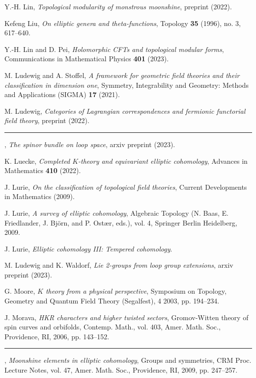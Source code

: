 \begin{description}[leftmargin=5.6em,labelwidth=5.2em,labelsep=0.4em,itemsep=0.5ex,parsep=0pt,topsep=0.8ex]
\item[\textbf{[Lin22]}] Y.-H. Lin, \textit{Topological modularity of monstrous moonshine}, preprint (2022).
\item[\textbf{[Liu96]}] Kefeng Liu, \textit{On elliptic genera and theta-functions}, Topology \textbf{35} (1996), no. 3, 617--640.
\item[\textbf{[LP23]}] Y.-H. Lin and D. Pei, \textit{Holomorphic CFTs and topological modular forms}, Communications in Mathematical Physics \textbf{401} (2023).
\item[\textbf{[LS21]}] M. Ludewig and A. Stoffel, \textit{A framework for geometric field theories and their classification in dimension one}, Symmetry, Integrability and Geometry: Methods and Applications (SIGMA) \textbf{17} (2021).
\item[\textbf{[Lud22]}] M. Ludewig, \textit{Categories of Lagrangian correspondences and fermionic functorial field theory}, preprint (2022).
\item[\textbf{[Lud23]}] \rule[0.45ex]{2.6em}{0.45pt}, \textit{The spinor bundle on loop space}, arxiv preprint (2023).
\item[\textbf{[Lue22]}] K. Luecke, \textit{Completed $K$-theory and equivariant elliptic cohomology}, Advances in Mathematics \textbf{410} (2022).
\item[\textbf{[Lur09a]}] J. Lurie, \textit{On the classification of topological field theories}, Current Developments in Mathematics (2009).
\item[\textbf{[Lur09b]}] J. Lurie, \textit{A survey of elliptic cohomology}, Algebraic Topology (N. Baas, E. Friedlander, J. Bj\"orn, and P. Ost\ae{}r, eds.), vol. 4, Springer Berlin Heidelberg, 2009.
\item[\textbf{[Lur19]}] J. Lurie, \textit{Elliptic cohomology III: Tempered cohomology}.
\item[\textbf{[LW23]}] M. Ludewig and K. Waldorf, \textit{Lie 2-groups from loop group extensions}, arxiv preprint (2023).
\item[\textbf{[Moo03]}] G. Moore, \textit{$K$ theory from a physical perspective}, Symposium on Topology, Geometry and Quantum Field Theory (Segalfest), 4 2003, pp. 194--234.
\item[\textbf{[Mor06]}] J. Morava, \textit{HKR characters and higher twisted sectors}, Gromov-Witten theory of spin curves and orbifolds, Contemp. Math., vol. 403, Amer. Math. Soc., Providence, RI, 2006, pp. 143--152.
\item[\textbf{[Mor09]}] \rule[0.45ex]{2.6em}{0.45pt}, \textit{Moonshine elements in elliptic cohomology}, Groups and symmetries, CRM Proc. Lecture Notes, vol. 47, Amer. Math. Soc., Providence, RI, 2009, pp. 247--257.

\end{description}
